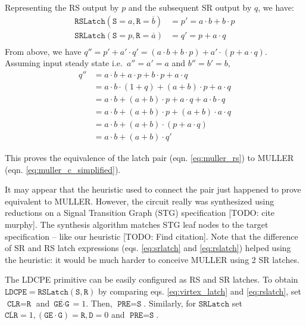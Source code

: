 Representing the RS output by $p$ and the subsequent SR output by $q$,
we have:
\begin{equation}\label{eq:muller_rs}
\begin{split}
	\texttt{RSLatch}(\texttt{S}=a, \texttt{R}=\overline{b}) &= p' = a \cdot b + b \cdot p \\
	\texttt{SRLatch}(\texttt{S}=p, \texttt{R}=\overline{a}) &= q' = p + a \cdot q \\
\end{split}
\end{equation}
From above, we have $q'' = p' + a' \cdot q' = (a \cdot b + b \cdot p) + 
a' \cdot (p + a \cdot q)$. 
Assuming input steady state i.e.\ $a'' = a' = a$ and $b'' = b' = b$,
\begin{equation}
\begin{split}
	q''& = a \cdot b + a \cdot p + b \cdot p + a \cdot q\\
	&= a \cdot b \cdot (1 + q) + (a + b ) \cdot p + a \cdot q\\
	&= a \cdot b + (a + b ) \cdot p + a \cdot q + a \cdot b \cdot q\\
	&= a \cdot b + (a + b ) \cdot p + (a + b) \cdot a \cdot q\\
	&= a \cdot b + (a + b ) \cdot (p + a \cdot q)\\
	&= a \cdot b + (a + b ) \cdot q'
\end{split}
\end{equation}

This proves the equivalence of the latch pair (eqn. \ref{eq:muller_rs}) to MULLER
(eqn. \ref{eq:muller_c_simplified}).

It may appear that the heuristic used to connect the pair just happened to
prove equivalent to MULLER. 
However, the circuit really was synthesized using reductions on a 
Signal Transition Graph (STG) specification [TODO: cite murphy]. 
The synthesis algorithm matches STG leaf nodes to the target specification -- like our heuristic [TODO: Find
citation]. 
Note that the difference of SR and RS latch expressions (eqs.
\ref{eq:srlatch} and \ref{eq:rslatch}) helped using the heuristic: it would be much harder
to conceive MULLER using 2 SR latches.

The LDCPE primitive can be easily configured as RS and SR latches. 
To obtain $\texttt{LDCPE} = \texttt{RSLatch}(\texttt{S}, \texttt{R})$ by comparing
eqs. \ref{eq:virtex_latch} and \ref{eq:rslatch}, set
$\texttt{CLR} = \texttt{R}$ and $\overline{\texttt{GE} \cdot \texttt{G}} = 1$.
Then, $\texttt{PRE} = \texttt{S}$.
Similarly, for $\texttt{SRLatch}$ set $\overline{\texttt{CLR}} = 1,
 (\texttt{GE} \cdot \texttt{G}) = \texttt{R}, \texttt{D} = 0$ and $\texttt{PRE}
 = \texttt{S}$.

